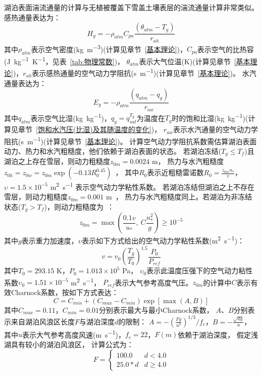 湖泊表面湍流通量的计算与无植被覆盖下雪盖土壤表层的湍流通量计算非常类似。感热通量表达为：
\begin{equation}
H_{g}=-\rho_{atm} C_{p a} \frac{\left(\theta_{atm}-T_{g}\right)}{r_{a h}}
\end{equation}
其中$\rho_{atm}$表示空气密度(\unit{kg.m^{-3}})(计算见章节~\ref{基本理论})，$C_{pa}$表示空气的比热容(\unit{J.kg^{-1}.K^{-1}}，见表~\ref{tab:物理常数})，
$\theta_{atm}$表示大气位温(K)(计算见章节~\ref{基本理论})，$r_{ah}$表示感热通量的空气动力学阻抗(\unit{s.m^{-1}})(计算见章节~\ref{基本理论})。
水汽通量表达为：
\begin{equation}
E_{g}=-\rho_{atm} \frac{\left(q_{atm}-q_{g}\right)}{r_{a w}}
\end{equation}
其中$q_{atm}$表示空气比湿(\unit{kg.kg^{-1}})，$q_g=q_{sat}^{T_g}$为温度在$T_g$时的饱和比湿(\unit{kg.kg^{-1}})(计算见章节~\ref{饱和水汽压(比湿)及其随温度的变化})，
$r_{aw}$表示水汽通量的空气动力学阻抗(\unit{s.m^{-1}})(计算见章节~\ref{基本理论})。
计算空气动力学阻抗系数需估算湖泊表面动力、热力和水汽粗糙度，他们依赖于湖泊表面的状态。
若湖泊冻结($T_g\leqslant T_f$)且湖泊之上存在雪层，则动力粗糙度$z_{0m}=0.0024$ m，
热力与水汽粗糙度$z_{0h}=z_{0w}=z_{0m}\exp{\left(-0.13R_0^{0.45}\right)}$~\citep{zilitinkevich1972dynamics}，
其中$R_0$表示近粗糙雷诺数$R_0=\frac{z_{0m}u_\ast}{\upsilon}$，
$\upsilon=1.5\times{10}^{-5}$ \unit{m^2.s^{-1}} 表示空气动力学粘性系数。
若湖泊冻结但湖泊之上不存在雪层，则动力粗糙度$z_{0m}=0.001$ m~\citep{subin2012improved}，
热力与水汽粗糙度同上。若湖泊为非冻结状态($T_g>T_f$)，则动力粗糙度为~\citep{subin2012improved}：
\begin{equation}
z_{0 m}=\max \left(\frac{0.1 v}{u_{*}},\ C \frac{u_{*}^{2}}{g}\right) \geqslant 10^{-5}
\end{equation}
其中$g$表示重力加速度，$\upsilon$表示如下方式给出的空气动力学粘性系数(\unit{m^2.s^{-1}})：
\begin{equation}
v=v_{0}\left(\frac{T_{g}}{T_{0}}\right)^{1.5} \frac{P_{0}}{P_{r e f}}
\end{equation}
其中$T_0=293.15$ K，$P_0=1.013\times{10}^5$ Pa，
$\upsilon_0$表示此温度压强下的空气动力粘性系数$\upsilon_0=1.51\times{10}^{-5}$ \unit{m^2.s^{-1}}，
$P_{ref}$表示大气参考高度气压。$z_{0m}$的计算中$C$表示有效Charnock系数，按如下方式表达：
\begin{equation}
C=C_{min}+\left(C_{max}-C_{min}\right) \exp\left[\max (A, B)\right]
\end{equation}
其中$C_{max}=0.11$，$C_{min}=0.01$分别表示最大与最小Charnock系数，
$A$、$B$分别表示来自湖泊风浪区长度$F$与湖泊深度$d$的限制：
$A=-\left(\frac{Fg}{u^2}\right)^{1/3}/f_c$，$B=-\frac{\sqrt{dg}}{u}$，
其中$u$表示大气参考高度风速(\unit{m.s^{-1}})，$f_c=22$，$F(m)$依赖于湖泊深度，
假定浅湖具有较小的湖泊风浪区，
计算公式为：$$F=\left\{\begin{array}{ll}100.0 & d<4.0 \\ 25.0 * d & d \geqslant 4.0\end{array}\right.$$


